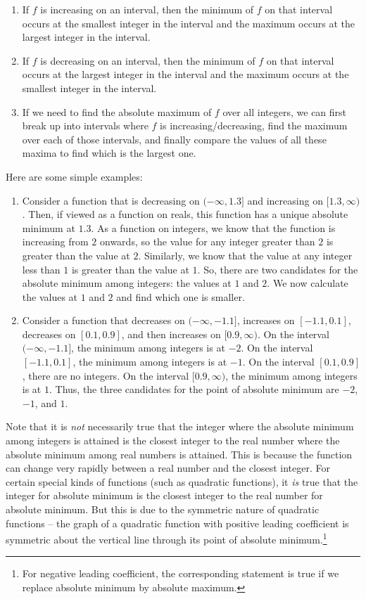 \documentclass[10pt]{amsart}
\begin{document}
\begin{enumerate}
\item If $f$ is increasing on an interval, then the minimum of $f$ on
  that interval occurs at the smallest integer in the interval and the
  maximum occurs at the largest integer in the interval.
\item If $f$ is decreasing on an interval, then the minimum of $f$ on
  that interval occurs at the largest integer in the interval and the
  maximum occurs at the smallest integer in the interval.
\item If we need to find the absolute maximum of $f$ over all
  integers, we can first break up into intervals where $f$ is
  increasing/decreasing, find the maximum over each of those
  intervals, and finally compare the values of all these maxima to
  find which is the largest one.
\end{enumerate}

Here are some simple examples:

\begin{enumerate}
\item Consider a function that is decreasing on $(-\infty,1.3]$ and
  increasing on $[1.3,\infty)$. Then, if viewed as a function on
  reals, this function has a unique absolute minimum at $1.3$. As a
  function on integers, we know that the function is increasing from
  $2$ onwards, so the value for any integer greater than $2$ is
  greater than the value at $2$. Similarly, we know that the value at
  any integer less than $1$ is greater than the value at $1$. So,
  there are two candidates for the absolute minimum among integers:
  the values at $1$ and $2$. We now calculate the values at $1$ and
  $2$ and find which one is smaller.
\item Consider a function that decreases on $(-\infty,-1.1]$,
  increases on $[-1.1,0.1]$, decreases on $[0.1,0.9]$, and then
  increases on $[0.9,\infty)$. On the interval $(-\infty,-1.1]$, the
  minimum among integers is at $-2$. On the interval $[-1.1,0.1]$, the
  minimum among integers is at $-1$. On the interval $[0.1,0.9]$,
  there are no integers. On the interval $[0.9,\infty)$, the minimum
  among integers is at $1$. Thus, the three candidates for the point
  of absolute minimum are $-2$, $-1$, and $1$.
\end{enumerate}

Note that it is {\em not} necessarily true that the integer where the
absolute minimum among integers is attained is the closest integer to
the real number where the absolute minimum among real numbers is
attained. This is because the function can change very rapidly between
a real number and the closest integer. For certain special kinds of
functions (such as quadratic functions), it {\em is} true that the
integer for absolute minimum is the closest integer to the real number
for absolute minimum. But this is due to the symmetric nature of
quadratic functions -- the graph of a quadratic function with positive
leading coefficient is symmetric about the vertical line through its
point of absolute minimum.\footnote{For negative leading coefficient,
the corresponding statement is true if we replace absolute minimum by
absolute maximum.}
\end{document}
